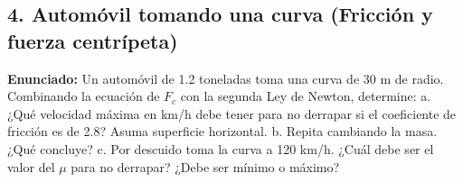 \documentclass[12pt, letterpaper]{article}
\begin{document}
	
	\subsection*{4. Automóvil tomando una curva (Fricción y fuerza centrípeta)}
	\noindent \textbf{Enunciado:} Un automóvil de 1.2 toneladas toma una curva de 30 m de radio. Combinando la ecuación de $F_c$ con la segunda Ley de Newton, determine: a. ¿Qué velocidad máxima en km/h debe tener para no derrapar si el coeficiente de fricción es de 2.8? Asuma superficie horizontal. b. Repita cambiando la masa. ¿Qué concluye? c. Por descuido toma la curva a 120 km/h. ¿Cuál debe ser el valor del $\mu$ para no derrapar? ¿Debe ser mínimo o máximo?
	
\end{document}
